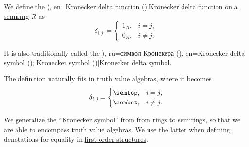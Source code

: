 \begin{definition}\label{def:kronecker_delta}\mimprovised
  We define the \term[ru=дельта-функция Кронекера (\cite[45]{БарановСтечкин2004ЭкстремальнаяКомбинаторика}), en=Kronecker delta function (\cite[16]{Hall1986CombinatorialTheory})]{Kronecker delta function} on a \hyperref[def:semiring]{semiring} \( R \) as
  \begin{equation}\label{eq:def:kronecker_delta}
    \delta_{i,j} \coloneqq \begin{cases}
      1_R, &i = j, \\
      0_R, &i \neq j.
    \end{cases}
  \end{equation}

  It is also traditionally called the \term[bg=символ на Кронекер (\cite[26]{Боянов2008ЧислениМетоди}), ru=символ Кронекера (\cite[461]{Тыртышников2007ЛинейнаяАлгебра}), en=Kronecker delta symbol (\cite[33]{Knuth1997ArtVol1}); Kronecker symbol (\cite[213]{Bourbaki1998Algebra1to3})]{Kronecker delta symbol}.

  The definition naturally fits in \hyperref[def:truth_value_algebra]{truth value algebras}, where it becomes
  \begin{equation}\label{eq:def:kronecker_delta/truth}
    \delta_{i,j} = \begin{cases}
      \semtop, &i = j, \\
      \sembot, &i \neq j.
    \end{cases}
  \end{equation}
\end{definition}
\begin{comments}
  \item We generalize the \enquote{Kronecker symbol} from \cite[213]{Bourbaki1998Algebra1to3} from rings to semirings, so that we are able to encompass truth value algebras. We use the latter when defining denotations for equality in \hyperref[def:fol_structure]{first-order structures}.
\end{comments}

